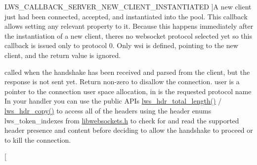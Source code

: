 \begin{Desc}
\begin{description}
{L\+W\+S\+\_\+\+C\+A\+L\+L\+B\+A\+C\+K\+\_\+\+S\+E\+R\+V\+E\+R\+\_\+\+N\+E\+W\+\_\+\+C\+L\+I\+E\+N\+T\+\_\+\+I\+N\+S\+T\+A\+N\+T\+I\+A\+T\+ED\hypertarget{group__usercb_ggad62860e19975ba4c4af401c3cdb6abf7ae9734e1d7af2abf291665ce9e4a728d3}{}\label{group__usercb_ggad62860e19975ba4c4af401c3cdb6abf7ae9734e1d7af2abf291665ce9e4a728d3}
}]A new client just had been connected, accepted, and instantiated into the pool. This callback allows setting any relevant property to it. Because this happens immediately after the instantiation of a new client, there\textquotesingle{}s no websocket protocol selected yet so this callback is issued only to protocol 0. Only wsi is defined, pointing to the new client, and the return value is ignored. \item[{\em 
L\+W\+S\+\_\+\+C\+A\+L\+L\+B\+A\+C\+K\+\_\+\+F\+I\+L\+T\+E\+R\+\_\+\+P\+R\+O\+T\+O\+C\+O\+L\+\_\+\+C\+O\+N\+N\+E\+C\+T\+I\+ON\hypertarget{group__usercb_ggad62860e19975ba4c4af401c3cdb6abf7accd8753672d319a30b4b4c2fb775e84d}{}\label{group__usercb_ggad62860e19975ba4c4af401c3cdb6abf7accd8753672d319a30b4b4c2fb775e84d}
}]called when the handshake has been received and parsed from the client, but the response is not sent yet. Return non-\/zero to disallow the connection. user is a pointer to the connection user space allocation, in is the requested protocol name In your handler you can use the public A\+P\+Is \hyperlink{group__HTTP-headers-read_ga8ade0e1ffb0da7e62b989d8d867bf6c8}{lws\+\_\+hdr\+\_\+total\+\_\+length()} / \hyperlink{group__HTTP-headers-read_ga6ce6aa1c0155ea42b7708bed271d1c77}{lws\+\_\+hdr\+\_\+copy()} to access all of the headers using the header enums lws\+\_\+token\+\_\+indexes from \hyperlink{libwebsockets_8h}{libwebsockets.\+h} to check for and read the supported header presence and content before deciding to allow the handshake to proceed or to kill the connection. \item[{\em 
}
\end{description}
\end{Desc}
